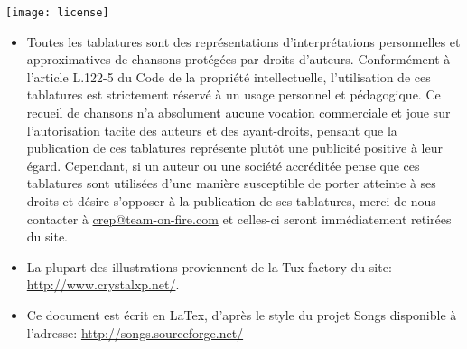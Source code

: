 \vspace{0.5cm}
\begin{center}
  \texttt{[image: license]}
\end{center}
\vspace{0.5cm}

\begin{itemize}
\item Toutes les tablatures sont des représentations d'interprétations
  personnelles et approximatives de chansons protégées par droits
  d'auteurs. Conformément à l'article L.122-5 du Code de la propriété
  intellectuelle, l'utilisation de ces tablatures est strictement
  réservé à un usage personnel et pédagogique. Ce recueil de chansons
  n'a absolument aucune vocation commerciale et joue sur
  l'autorisation tacite des auteurs et des ayant-droits, pensant que
  la publication de ces tablatures représente plutôt une publicité
  positive à leur égard. Cependant, si un auteur ou une société
  accréditée pense que ces tablatures sont utilisées d'une manière
  susceptible de porter atteinte à ses droits et désire s'opposer à la
  publication de ses tablatures, merci de nous contacter à
  \url{crep@team-on-fire.com} et celles-ci seront immédiatement
  retirées du site.
\item La plupart des illustrations proviennent de la Tux factory
  du site: \url{http://www.crystalxp.net/}.
\item Ce document est écrit en LaTex, d'après le style du projet Songs
  disponible à l'adresse: \url{http://songs.sourceforge.net/}
\end{itemize}


